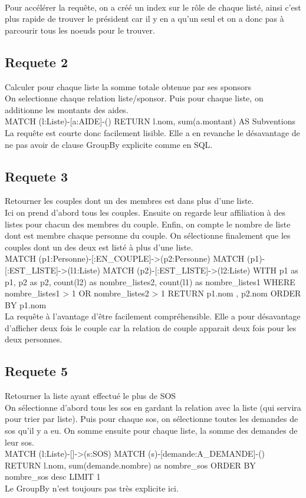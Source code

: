 \documentclass[a4paper,oneside,1pt]{article}
\begin{document}
\\Pour accélérer la requête, on a créé un index sur le rôle de chaque listé, ainsi c'est plus rapide de trouver le président car il y en a qu'un seul et on a donc pas à parcourir tous les noeuds pour le trouver.


\subsection{Requete 2}
Calculer pour chaque liste la somme totale obtenue par ses sponsors
\\
On selectionne chaque relation liste/sponsor. Puis pour chaque liste, on additionne les montants des aides.
\\
MATCH (l:Liste)-[a:AIDE]-() 
RETURN l.nom, sum(a.montant) AS Subventions
\\
La requête est courte donc facilement lisible. Elle a en revanche le désavantage de ne pas avoir de clause GroupBy explicite comme en SQL.

\subsection{Requete 3}
Retourner les couples dont un des membres est dans plus d'une liste.
\\
Ici on prend d'abord tous les couples. Ensuite on regarde leur affiliation à des listes pour chacun des membres du couple. Enfin, on compte le nombre de liste dont est membre chaque personne du couple. On sélectionne finalement que les couples dont un des deux est listé à plus d'une liste.
\\
MATCH (p1:Personne)-[:EN_COUPLE]->(p2:Personne)
MATCH (p1)-[:EST_LISTE]->(l1:Liste)
MATCH (p2)-[:EST_LISTE]->(l2:Liste)
WITH p1 as p1, p2 as p2, count(l2) as nombre_listes2, count(l1) as nombre_listes1
WHERE nombre_listes1 > 1 OR nombre_listes2 > 1 
RETURN p1.nom , p2.nom
ORDER BY p1.nom
\\
La requête à l'avantage d'être facilement compréhensible. Elle a pour désavantage d'afficher deux fois le couple car la relation de couple apparait deux fois pour les deux personnes.

\subsection{Requete 5}
Retourner la liste ayant effectué le plus de SOS
\\
On sélectionne d'abord tous les sos en gardant la relation avec la liste (qui servira pour trier par liste). Puis pour chaque sos, on sélectionne toutes les demandes de sos qu'il y a eu. On somme ensuite pour chaque liste, la somme des demandes de leur sos.
\\
MATCH (l:Liste)-[]->(s:SOS)
MATCH (s)-[demande:A_DEMANDE]-()
RETURN l.nom, sum(demande.nombre) as nombre_sos
ORDER BY nombre_sos desc LIMIT 1
\\ 
Le GroupBy n'est toujours pas très explicite ici.
\end{document}
